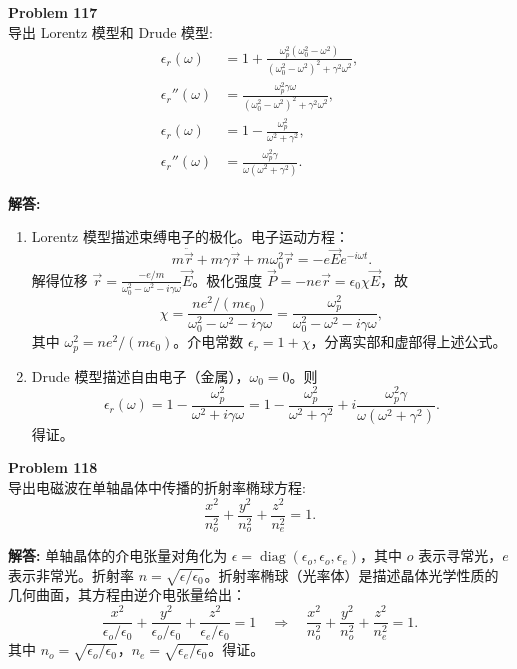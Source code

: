 \documentclass[12pt, a4paper, oneside]{ctexart}
\newenvironment{solution}{\par\noindent\textbf{解答:}\quad}{\par}
\begin{document}
\begin{mdframed}[backgroundcolor=gray!10, linewidth=0pt]
    \textbf{Problem 117} \\
    导出 Lorentz 模型和 Drude 模型:
    \[
    \begin{aligned}
        \epsilon_r(\omega) &= 1 + \frac{\omega_p^2 (\omega_0^2 - \omega^2)}{(\omega_0^2 - \omega^2)^2 + \gamma^2 \omega^2}, \\
        \epsilon_r''(\omega) &= \frac{\omega_p^2 \gamma \omega}{(\omega_0^2 - \omega^2)^2 + \gamma^2 \omega^2}, \\
        \epsilon_r(\omega) &= 1 - \frac{\omega_p^2}{\omega^2 + \gamma^2}, \\
        \epsilon_r''(\omega) &= \frac{\omega_p^2 \gamma}{\omega (\omega^2 + \gamma^2)}.
    \end{aligned}
    \]
\end{mdframed}
\begin{solution}
    \begin{enumerate}
        \item Lorentz 模型描述束缚电子的极化。电子运动方程：
        \[
        m \ddot{\vec{r}} + m \gamma \dot{\vec{r}} + m \omega_0^2 \vec{r} = -e \vec{E} e^{-i\omega t}.
        \]
        解得位移 $\vec{r} = \frac{-e/m}{\omega_0^2 - \omega^2 - i\gamma \omega} \vec{E}$。极化强度 $\vec{P} = -n e \vec{r} = \epsilon_0 \chi \vec{E}$，故
        \[
        \chi = \frac{n e^2 / (m \epsilon_0)}{\omega_0^2 - \omega^2 - i\gamma \omega} = \frac{\omega_p^2}{\omega_0^2 - \omega^2 - i\gamma \omega},
        \]
        其中 $\omega_p^2 = n e^2/(m \epsilon_0)$。介电常数 $\epsilon_r = 1 + \chi$，分离实部和虚部得上述公式。
        \item Drude 模型描述自由电子（金属），$\omega_0=0$。则
        \[
        \epsilon_r(\omega) = 1 - \frac{\omega_p^2}{\omega^2 + i\gamma \omega} = 1 - \frac{\omega_p^2}{\omega^2 + \gamma^2} + i \frac{\omega_p^2 \gamma}{\omega (\omega^2 + \gamma^2)}.
        \]
        得证。
    \end{enumerate}
\end{solution}

\begin{mdframed}[backgroundcolor=gray!10, linewidth=0pt]
    \textbf{Problem 118} \\
    导出电磁波在单轴晶体中传播的折射率椭球方程:
    \[
    \frac{x^2}{n_o^2} + \frac{y^2}{n_o^2} + \frac{z^2}{n_e^2} = 1.
    \]
\end{mdframed}
\begin{solution}
    单轴晶体的介电张量对角化为 $\epsilon = \operatorname{diag}(\epsilon_o, \epsilon_o, \epsilon_e)$，其中 $o$ 表示寻常光，$e$ 表示非常光。折射率 $n = \sqrt{\epsilon / \epsilon_0}$。折射率椭球（光率体）是描述晶体光学性质的几何曲面，其方程由逆介电张量给出：
    \[
    \frac{x^2}{\epsilon_o / \epsilon_0} + \frac{y^2}{\epsilon_o / \epsilon_0} + \frac{z^2}{\epsilon_e / \epsilon_0} = 1 \quad \Rightarrow \quad \frac{x^2}{n_o^2} + \frac{y^2}{n_o^2} + \frac{z^2}{n_e^2} = 1.
    \]
    其中 $n_o = \sqrt{\epsilon_o / \epsilon_0}$，$n_e = \sqrt{\epsilon_e / \epsilon_0}$。得证。
\end{solution}
\end{document}
